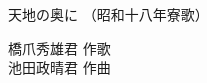 \documentclass[10pt,b5j]{tarticle} %
\begin{document}
\begin{minipage}[c]{0.7\hsize} %
    \begin{center}
        {\LARGE
            天地の奥に %
        }
        {\small 
            （昭和十八年寮歌） %
        }
    \end{center}
\end{minipage}
\begin{minipage}[c]{0.3\hsize} %
    \begin{flushright} %
        橋爪秀雄君 作歌\\池田政晴君 作曲 %
    \end{flushright}
\end{minipage}
\end{document}
